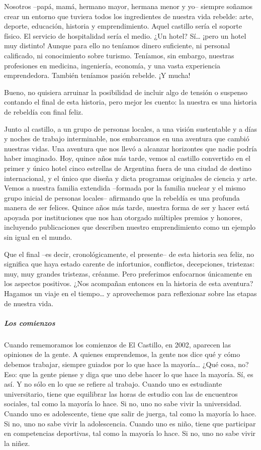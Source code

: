 \documentclass[
]{article}
\begin{document}
Nosotros --papá, mamá, hermano mayor, hermana menor y yo-- siempre
soñamos crear un entorno que tuviera todos los ingredientes de nuestra
vida rebelde: arte, deporte, educación, historia y emprendimiento. Aquel
castillo sería el soporte físico. El servicio de hospitalidad sería el
medio. ¿Un hotel? Sí\ldots{} ¡pero un hotel muy distinto! Aunque para
ello no teníamos dinero suficiente, ni personal calificado, ni
conocimiento sobre turismo. Teníamos, sin embargo, nuestras profesiones
en medicina, ingeniería, economía, y una vasta experiencia emprendedora.
También teníamos pasión rebelde. ¡Y mucha!

Bueno, no quisiera arruinar la posibilidad de incluir algo de tensión o
suspenso contando el final de esta historia, pero mejor les cuento: la
nuestra es una historia de rebeldía con final feliz.

Junto al castillo, a un grupo de personas locales, a una visión
sustentable y a días y noches de trabajo interminable, nos embarcamos en
una aventura que cambió nuestras vidas. Una aventura que nos llevó a
alcanzar horizontes que nadie podría haber imaginado. Hoy, quince años
más tarde, vemos al castillo convertido en el primer y único hotel cinco
estrellas de Argentina fuera de una ciudad de destino internacional, y
el único que diseña y dicta programas originales de ciencia y arte.
Vemos a nuestra familia extendida --formada por la familia nuclear y el
mismo grupo inicial de personas locales-- afirmando que la rebeldía es
una profunda manera de ser felices. Quince años más tarde, nuestra forma
de ser y hacer está apoyada por instituciones que nos han otorgado
múltiples premios y honores, incluyendo publicaciones que describen
nuestro emprendimiento como un ejemplo sin igual en el mundo.

Que el final --es decir, cronológicamente, el presente-- de esta
historia sea feliz, no significa que haya estado carente de infortunios,
conflictos, decepciones, tristezas: muy, muy grandes tristezas, créanme.
Pero preferimos enfocarnos únicamente en los aspectos positivos. ¿Nos
acompañan entonces en la historia de esta aventura? Hagamos un viaje en
el tiempo\ldots{} y aprovechemos para reflexionar sobre las etapas de
nuestra vida.

\hypertarget{los-comienzos}{%
\subparagraph{Los comienzos}\label{los-comienzos}}

Cuando rememoramos los comienzos de El Castillo, en 2002, aparecen las
opiniones de la gente. A quienes emprendemos, la gente nos dice qué y
cómo debemos trabajar, siempre guiados por lo que hace la
mayoría\ldots{} ¿Qué cosa, no? Eso: que la gente piense y diga que uno
debe hacer lo que hace la mayoría. Sí, es así. Y no sólo en lo que se
refiere al trabajo. Cuando uno es estudiante universitario, tiene que
equilibrar las horas de estudio con las de encuentros sociales, tal como
la mayoría lo hace. Si no, uno no sabe vivir la universidad. Cuando uno
es adolescente, tiene que salir de juerga, tal como la mayoría lo hace.
Si no, uno no sabe vivir la adolescencia. Cuando uno es niño, tiene que
participar en competencias deportivas, tal como la mayoría lo hace. Si
no, uno no sabe vivir la niñez.
\end{document}
